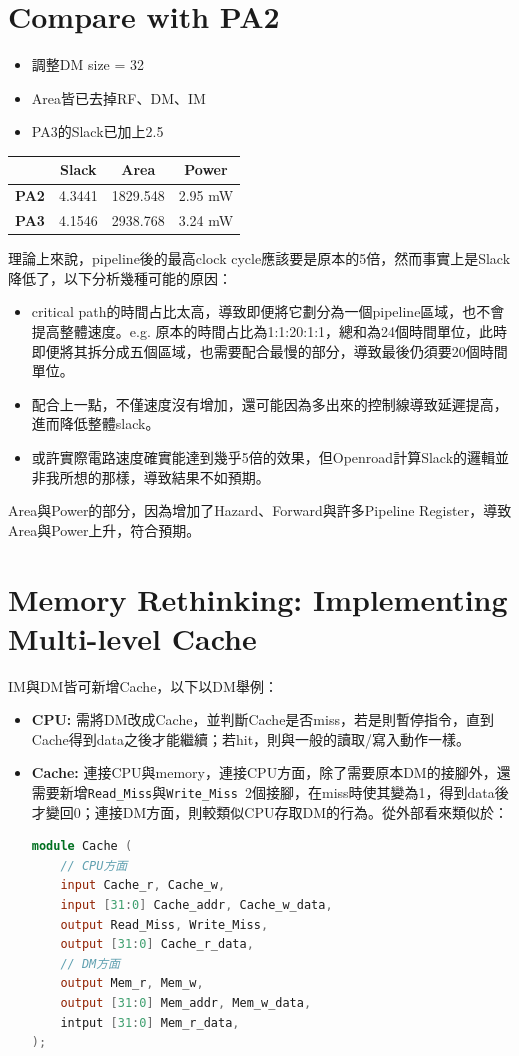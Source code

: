 \documentclass[12pt]{article}
\begin{document}
\section{Compare with PA2}
\begin{itemize}
    \item 調整DM size = 32
    \item Area皆已去掉RF、DM、IM
    \item PA3的Slack已加上2.5
\end{itemize}
\begin{center}
\begin{tabular}{ |c|c|c|c| } 
    \hline
     & \textbf{Slack} & \textbf{Area} & \textbf{Power} \\ 
    \hline
    \textbf{PA2} & 4.3441 & 1829.548 & 2.95 mW \\ 
    \hline
    \textbf{PA3} & 4.1546 & 2938.768 & 3.24 mW \\ 
    \hline
\end{tabular}
\end{center}
理論上來說，pipeline後的最高clock cycle應該要是原本的5倍，然而事實上是Slack降低了，以下分析幾種可能的原因：
\begin{itemize}
    \item critical path的時間占比太高，導致即便將它劃分為一個pipeline區域，也不會提高整體速度。e.g. 原本的時間占比為1:1:20:1:1，總和為24個時間單位，此時即便將其拆分成五個區域，也需要配合最慢的部分，導致最後仍須要20個時間單位。
    \item 配合上一點，不僅速度沒有增加，還可能因為多出來的控制線導致延遲提高，進而降低整體slack。
    \item 或許實際電路速度確實能達到幾乎5倍的效果，但Openroad計算Slack的邏輯並非我所想的那樣，導致結果不如預期。
\end{itemize}
Area與Power的部分，因為增加了Hazard、Forward與許多Pipeline Register，導致Area與Power上升，符合預期。



\section{Memory Rethinking: Implementing Multi-level Cache}
IM與DM皆可新增Cache，以下以DM舉例：
\begin{itemize}
    \item \textbf{CPU:} 需將DM改成Cache，並判斷Cache是否miss，若是則暫停指令，直到Cache得到data之後才能繼續；若hit，則與一般的讀取/寫入動作一樣。
    \item \textbf{Cache:} 連接CPU與memory，連接CPU方面，除了需要原本DM的接腳外，還需要新增\texttt{Read\_Miss}與\texttt{Write\_Miss }2個接腳，在miss時使其變為1，得到data後才變回0；連接DM方面，則較類似CPU存取DM的行為。從外部看來類似於：
    \begin{lstlisting}[language=Verilog]
module Cache (
    // CPU方面
    input Cache_r, Cache_w,
    input [31:0] Cache_addr, Cache_w_data,
    output Read_Miss, Write_Miss,
    output [31:0] Cache_r_data,
    // DM方面
    output Mem_r, Mem_w,
    output [31:0] Mem_addr, Mem_w_data,
    intput [31:0] Mem_r_data,
);
    \end{lstlisting}
\end{itemize}
\end{document}
